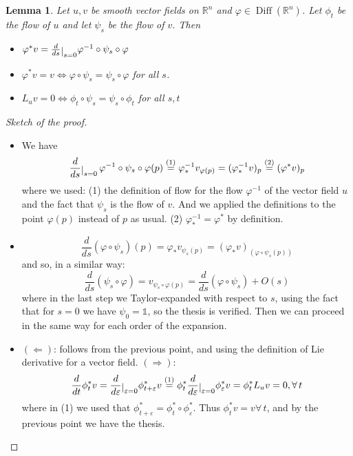 \documentclass[a4paper,11pt,titlepage, article, oneside]{memoir}
\numberwithin{equation}{section}
\newtheorem{lemma}[theorem]{Lemma}
\theoremstyle{definition}
\theoremstyle{remark}
\DeclareMathOperator{\Diff}{Diff}
\newcommand{\rfield}{\mathbb{R}}
\newcommand{\restrict}[2]{{#1}\raisebox{-.5ex}{$|$}_{#2}}
\begin{document}
\begin{lemma} \label{lemmadiff1}
  Let $u, v$ be smooth vector fields on $\rfield^n$ and $\varphi \in \Diff(\rfield^n)$. Let $\phi_t$ be the flow of $u$ and let $\psi_s$ be the flow of $v$. Then
  \begin{itemize}
    \item $\varphi^*v = \restrict{\frac{d}{ds}}{s=0} \varphi^{-1} \circ \psi_s \circ \varphi$
    \item $\varphi^*v = v \Leftrightarrow \varphi \circ \psi_s = \psi_s \circ \varphi$ for all $s$.
    \item $L_u v = 0 \Leftrightarrow \phi_t \circ \psi_s = \psi_s \circ \phi_t$ for all $s, t$
  \end{itemize}
\end{lemma}
\begin{proof}[Sketch of the proof]
$ $
\begin{itemize}
\item We have
$$\restrict{\frac{d}{ds}}{s=0} \,  \varphi^{-1} \circ \psi_s \circ \varphi (p) \overset{(1)}{=} \varphi^{-1}_* v_{\varphi(p)} = (\varphi_*^{-1} v)_p \overset{(2)}{=} (\varphi^* v)_p$$
where we used: (1) the definition of flow for the flow $\varphi^{-1}$ of the vector field $u$ and the fact that $\psi_s$ is the flow of $v$. And we applied the definitions to the point $\varphi(p)$ instead of $p$ as usual. (2) $\varphi_*^{-1} = \varphi^*$ by definition.
\item $$\frac{d}{ds} (\varphi \circ \psi_s)(p) = \varphi_* v_{\psi_s(p)} = (\varphi_* v)_(\varphi \circ \psi_s(p))$$
and so, in a similar way:
$$\frac{d}{ds}(\psi_s \circ \varphi) = v_{\psi_s \circ \varphi(p)} = \frac{d}{ds} (\varphi \circ \psi_s) + O(s)$$
where in the last step we Taylor-expanded with respect to $s$, using the fact that for $s=0$ we have $\psi_0 = \mathbb{1}$, so the thesis is verified. Then we can proceed in the same way for each order of the expansion.
\item $(\Leftarrow)$: follows from the previous point, and using the definition of Lie derivative for a vector field. $(\Rightarrow)$: 
$$\frac{d}{dt} \phi_t^* v = \restrict{\frac{d}{d\varepsilon}}{\varepsilon=0} \phi^*_{t + \varepsilon} v \overset{(1)}{=} \phi_t^* \restrict{\frac{d}{d \varepsilon}}{\varepsilon=0} \phi^*_{\varepsilon} v = \phi_t^* L_u v = 0, \forall \, t$$
where in (1) we used that $\phi^*_{t + \varepsilon} = \phi_t^* \circ \phi^*_{\varepsilon}$.
Thus $\phi_t^* v = v \forall \, t$, and by the previous point we have the thesis.
\end{itemize}
\end{proof}
\end{document}

